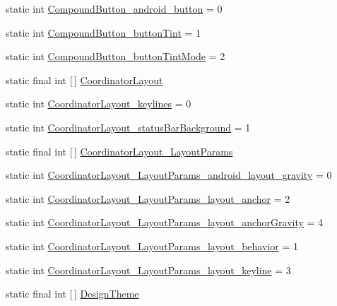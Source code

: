 \begin{DoxyCompactItemize}
static int \hyperlink{classandroid_1_1support_1_1design_1_1R_1_1styleable_a7c86b766680036719cc2fc26e73455d2}{Compound\+Button\+\_\+android\+\_\+button} = 0
\item 
static int \hyperlink{classandroid_1_1support_1_1design_1_1R_1_1styleable_adb51f0ae98fba003b81f70cc31d6d226}{Compound\+Button\+\_\+button\+Tint} = 1
\item 
static int \hyperlink{classandroid_1_1support_1_1design_1_1R_1_1styleable_a61a4f9064091d383cddade36d380b0b7}{Compound\+Button\+\_\+button\+Tint\+Mode} = 2
\item 
static final int \mbox{[}$\,$\mbox{]} \hyperlink{classandroid_1_1support_1_1design_1_1R_1_1styleable_aa61378a506fc889e9e7af20a32b5fa05}{Coordinator\+Layout}
\item 
static int \hyperlink{classandroid_1_1support_1_1design_1_1R_1_1styleable_a61311d684777dd9d1ff2b1e62326b8ef}{Coordinator\+Layout\+\_\+keylines} = 0
\item 
static int \hyperlink{classandroid_1_1support_1_1design_1_1R_1_1styleable_ab58445af81b09a3c56a576412fa98b25}{Coordinator\+Layout\+\_\+status\+Bar\+Background} = 1
\item 
static final int \mbox{[}$\,$\mbox{]} \hyperlink{classandroid_1_1support_1_1design_1_1R_1_1styleable_a8dd236b417b377b73830c1c47c3b2490}{Coordinator\+Layout\+\_\+\+Layout\+Params}
\item 
static int \hyperlink{classandroid_1_1support_1_1design_1_1R_1_1styleable_a4f19a966939e4daa90156b8714754325}{Coordinator\+Layout\+\_\+\+Layout\+Params\+\_\+android\+\_\+layout\+\_\+gravity} = 0
\item 
static int \hyperlink{classandroid_1_1support_1_1design_1_1R_1_1styleable_a2b541addd48569ad627329eb45eb5445}{Coordinator\+Layout\+\_\+\+Layout\+Params\+\_\+layout\+\_\+anchor} = 2
\item 
static int \hyperlink{classandroid_1_1support_1_1design_1_1R_1_1styleable_a62798f0cfacf5c8b36479c1585a47c87}{Coordinator\+Layout\+\_\+\+Layout\+Params\+\_\+layout\+\_\+anchor\+Gravity} = 4
\item 
static int \hyperlink{classandroid_1_1support_1_1design_1_1R_1_1styleable_a7080bda2bea789b4e55596a0b650c34e}{Coordinator\+Layout\+\_\+\+Layout\+Params\+\_\+layout\+\_\+behavior} = 1
\item 
static int \hyperlink{classandroid_1_1support_1_1design_1_1R_1_1styleable_a4261fa2784dbde0962e2046fc2bbfb18}{Coordinator\+Layout\+\_\+\+Layout\+Params\+\_\+layout\+\_\+keyline} = 3
\item 
static final int \mbox{[}$\,$\mbox{]} \hyperlink{classandroid_1_1support_1_1design_1_1R_1_1styleable_a340277a41103d3ce86cf1861cc50c1c9}{Design\+Theme}

\end{DoxyCompactItemize}
